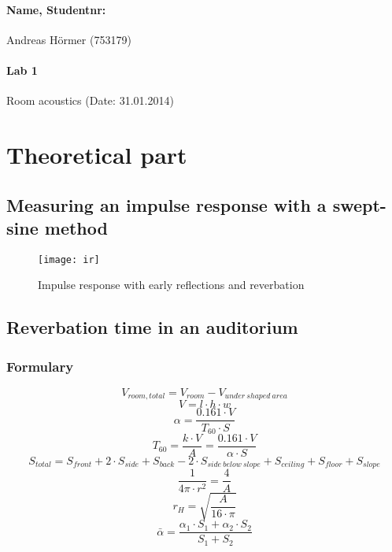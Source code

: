 \documentclass{article}
\begin{document}
	\paragraph{Name, Studentnr: }Andreas H\"ormer (753179)
	\paragraph{Lab 1}Room acoustics (Date: 31.01.2014)

	\section{Theoretical part}
		\subsection{Measuring an impulse response with a swept-sine method}
			\begin{figure}[htbp]
				\begin{center}
					\texttt{[image: ir]}
					\caption{Impulse response with early reflections and reverbation}
					\label{irtheory}
				\end{center}
			\end{figure}

		\subsection{Reverbation time in an auditorium}
			\subsubsection{Formulary}
				\begin{equation}
					V_{room,total}=V_{room}-V_{under\ shaped\ area}
				\end{equation}
				\begin{equation}
					V=l\cdot h\cdot w
				\end{equation}
				\begin{equation}
					\alpha=\frac{0.161\cdot V}{T_{60}\cdot S}
				\end{equation}
				\begin{equation}
					T_{60}=\frac{k\cdot V}{A}=\frac{0.161\cdot V}{\alpha\cdot S}
				\end{equation}
				\begin{equation}
					S_{total}=S_{front}+2\cdot S_{side}+S_{back}-2\cdot S_{side\ below\ slope}+S_{ceiling}+S_{floor}+S_{slope}
				\end{equation}
				\begin{equation}
					\frac{1}{4\pi\cdot r^2}=\frac{4}{A}
				\end{equation}
				\begin{equation}
					r_H=\sqrt{\frac{A}{16\cdot\pi}}
				\end{equation}
				\begin{equation}
					\bar{\alpha}=\frac{\alpha_1\cdot S_1+\alpha_2\cdot S_2}{S_1+S_2}
				\end{equation}
\end{document}
